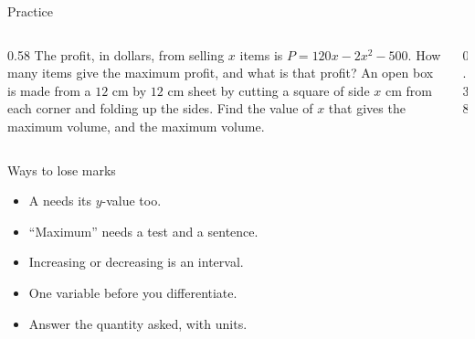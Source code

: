 \documentclass[aspectratio=169,11pt,t,xcolor=table]{beamer}
\newlength\figunit
\begin{document}
\begin{frame}{Practice}\relax
\begin{columns}[T]
\begin{column}{0.58\textwidth}
 The profit, in dollars, from selling $x$ items is $P=120x-2x^{2}-500$. How many items give the maximum profit, and what is that profit?
\vskip5mm
 An open box is made from a $12$ cm by $12$ cm sheet by cutting a square of side $x$ cm from each corner and folding up the sides. Find the value of $x$ that gives the maximum volume, and the maximum volume.
\end{column}
\begin{column}{0.38\textwidth}\centering\vskip18mm
\setlength\figunit{12mm}

\end{column}
\end{columns}
\end{frame}

\begin{frame}{Ways to lose marks}\relax
\begin{itemize}
\item[\lmnum{noy}] A \tturn needs its $y$-value too.
\item[\lmnum{nojust}] ``Maximum'' needs a test and a sentence.
\item[\lmnum{interval}] Increasing or decreasing is an interval.
\item[\lmnum{twovars}] One variable before you differentiate.
\item[\lmnum{wrongq}] Answer the quantity asked, with units.
\end{itemize}
\end{frame}
\end{document}
